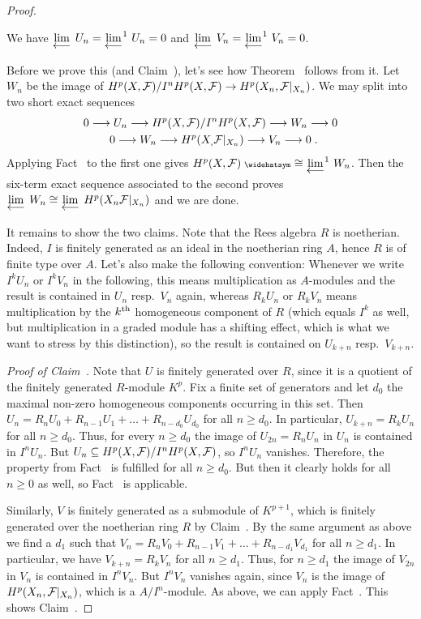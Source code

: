 \documentclass[a4paper,parskip=half,numbers=enddot, DIV=12]{scrreprt}
\renewcommand{\geq}{\geqslant}
\begin{document}
\begin{proof}
\begin{claim}
		We have $\limit U_n=\limit[][^1]U_n=0$ and $\limit V_n=\limit[][^1]V_n=0$.
	\end{claim}
	Before we prove this (and Claim~), let's see how Theorem~ follows from it. Let $W_n$ be the image of $H^p(X,\Ff)/I^nH^p(X,\Ff)\morphism H^p(X_n,\Ff|_{X_n})$. We may split  into two short exact sequences
	\begin{gather*}
		0\morphism U_n\morphism H^p(X,\Ff)/I^nH^p(X,\Ff)\morphism W_n\morphism 0\\
		\hphantom{\;.}0\morphism W_n\morphism H^p(X_,\Ff|_{X_n})\morphism V_n\morphism 0\;.
	\end{gather*}
	Applying Fact~ to the first one gives $H^p(X,\Ff)^\complete\cong \limit[][^1]W_n$. Then the six-term exact sequence associated to the second proves $\limit W_n\cong \limit H^p(X_n\Ff|_{X_n})$ and we are done.
	
	It remains to show the two claims. Note that the Rees algebra $R$ is noetherian. Indeed, $I$ is finitely generated as an ideal in the noetherian ring $A$, hence $R$ is of finite type over $A$. Let's also make the following convention: Whenever we write $I^kU_n$ or $I^kV_n$ in the following, this means multiplication as $A$-modules and the result is contained in $U_n$ resp.\ $V_n$ again, whereas $R_kU_n$ or $R_kV_n$ means multiplication by the $k^{\text{th}}$ homogeneous component of $R$ (which equals $I^k$ as well, but multiplication in a graded module has a shifting effect, which is what we want to stress by this distinction), so the result is contained on $U_{k+n}$ resp.\ $V_{k+n}$.
	
	\emph{Proof of Claim~.} Note that $U$ is finitely generated over $R$, since it is a quotient of the finitely generated $R$-module $K^p$. Fix a finite set of generators and let $d_0$ the maximal non-zero homogeneous components occurring in this set. Then $U_n=R_nU_0+R_{n-1}U_1+\ldots+R_{n-d_0}U_{d_0}$ for all $n\geq d_0$. In particular, $U_{k+n}=R_kU_n$ for all $n\geq d_0$. Thus, for every $n\geq d_0$ the image of $U_{2n}=R_nU_n$ in $U_n$ is contained in $I^nU_n$. But $U_n\subseteq H^p(X,\mathcal{F})/I^nH^p(X,\mathcal{F})$, so $I^nU_n$ vanishes. Therefore, the property from Fact~ is fulfilled for all $n\geq d_0$. But then it clearly holds for all $n\geq 0$ as well, so Fact~ is applicable.
	
	Similarly, $V$ is finitely generated as a submodule of $K^{p+1}$, which is finitely generated over the noetherian ring $R$ by Claim~. By the same argument as above we find a $d_1$ such that $V_n=R_nV_0+R_{n-1}V_1+\ldots+R_{n-d_1}V_{d_1}$ for all $n\geqslant d_1$. In particular, we have $V_{k+n}=R_kV_n$ for all $n\geq d_1$. Thus, for $n\geq d_1$ the image of $V_{2n}$ in $V_n$ is contained in $I^nV_n$. But $I^nV_n$ vanishes again, since $V_n$ is the image of $H^p(X_n,\mathcal{F}|_{X_n})$, which is a $A/I^n$-module. As above, we can apply Fact~. This shows Claim~.
	

\end{proof}
\end{document}
